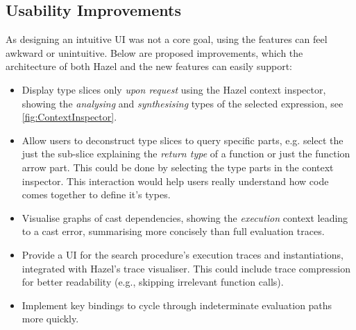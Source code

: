 \subsection{Usability Improvements}\label{sec:UIImprovements}
As designing an intuitive UI was not a core goal, using the features can feel awkward or unintuitive. Below are proposed improvements, which the architecture of both Hazel and the new features can easily support:

\begin{itemize}
\item Display type slices only \textit{upon request} using the Hazel context inspector, showing the \textit{analysing} and \textit{synthesising} types of the selected expression, see \cref{fig:ContextInspector}.
\item Allow users to deconstruct type slices to query specific parts, e.g. select the just the sub-slice explaining the \textit{return type} of a function or just the function arrow part. This could be done by selecting the type parts in the context inspector.
This interaction would help users really understand how code comes together to define it's types.
\item Visualise graphs of cast dependencies, showing the \textit{execution} context leading to a cast error, summarising more concisely than full evaluation traces.
\item Provide a UI for the search procedure's execution traces and instantiations, integrated with Hazel's trace visualiser. This could include trace compression for better readability (e.g., skipping irrelevant function calls).
\item Implement key bindings to cycle through indeterminate evaluation paths more quickly.
\end{itemize}
